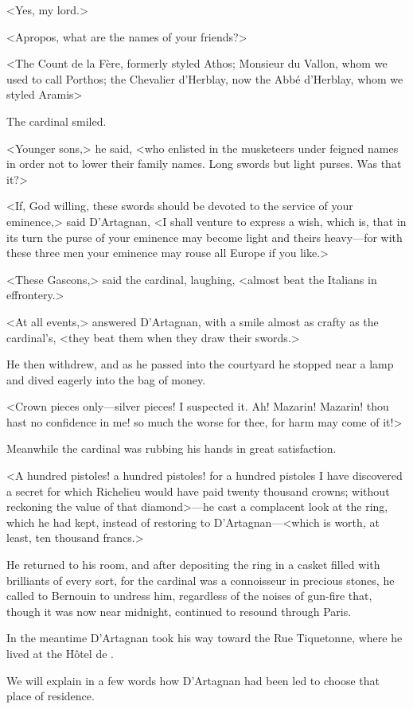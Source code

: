 <Yes, my lord.>

<Apropos, what are the names of your friends?>

<The Count de la Fère, formerly styled Athos; Monsieur du Vallon, whom we used to call Porthos; the Chevalier d'Herblay, now the Abbé d'Herblay, whom we styled Aramis\longdash>

The cardinal smiled.

<Younger sons,> he said, <who enlisted in the musketeers under feigned names in order not to lower their family names. Long swords but light purses. Was that it?>

<If, God willing, these swords should be devoted to the service of your eminence,> said D'Artagnan, <I shall venture to express a wish, which is, that in its turn the purse of your eminence may become light and theirs heavy—for with these three men your eminence may rouse all Europe if you like.>

<These Gascons,> said the cardinal, laughing, <almost beat the Italians in effrontery.>

<At all events,> answered D'Artagnan, with a smile almost as crafty as the cardinal's, <they beat them when they draw their swords.>

He then withdrew, and as he passed into the courtyard he stopped near a lamp and dived eagerly into the bag of money.

<Crown pieces only—silver pieces! I suspected it. Ah! Mazarin! Mazarin! thou hast no confidence in me! so much the worse for thee, for harm may come of it!>

Meanwhile the cardinal was rubbing his hands in great satisfaction.

<A hundred pistoles! a hundred pistoles! for a hundred pistoles I have discovered a secret for which Richelieu would have paid twenty thousand crowns; without reckoning the value of that diamond>—he cast a complacent look at the ring, which he had kept, instead of restoring to D'Artagnan—<which is worth, at least, ten thousand francs.>

He returned to his room, and after depositing the ring in a casket filled with brilliants of every sort, for the cardinal was a connoisseur in precious stones, he called to Bernouin to undress him, regardless of the noises of gun-fire that, though it was now near midnight, continued to resound through Paris.

In the meantime D'Artagnan took his way toward the Rue Tiquetonne, where he lived at the Hôtel de .

We will explain in a few words how D'Artagnan had been led to choose that place of residence. 